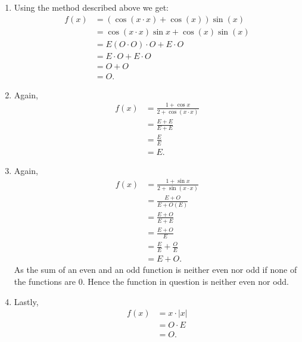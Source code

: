 \begin{derivation}
  \begin{enumerate}[label=\alph*)]
    \item Using the method described above we get:
      \begin{align*}
        f(x) &= \left( \cos \left( x \cdot x \right) + \cos(x) \right) \sin(x) \\
        &= \cos (x \cdot x) \sin x + \cos (x) \sin (x) \\
        &= E(O\cdot O) \cdot O + E \cdot O \\
        &= E \cdot O + E \cdot O \\
        &= O + O \\
        &= O
      .\end{align*}
    \item Again,
      \begin{align*}
        f(x) &= \frac{1 + \cos x}{2 + \cos(x\cdot x)} \\
        &= \frac{E + E}{E + E} \\
        &= \frac{E}{E} \\
        &= E
      .\end{align*}
    \item Again,
      \begin{align*}
        f(x) &= \frac{1 + \sin x}{2 + \sin \left( x \cdot x\right)} \\
        &= \frac{E + O}{E + O(E)} \\
        &= \frac{E + O}{E + E} \\
        &= \frac{E + O}{E} \\
        &= \frac{E}{E} + \frac{O}{E} \\
        &= E + O
      .\end{align*}
      As the sum of an even and an odd function is neither even nor odd if none of the functions are $0$.
      Hence the function in question is neither even nor odd.
    \item Lastly,
      \begin{align*}
        f(x) &= x \cdot \left| x \right| \\
        &= O \cdot E \\
        &= O
      .\end{align*}
  \end{enumerate}
\end{derivation}



